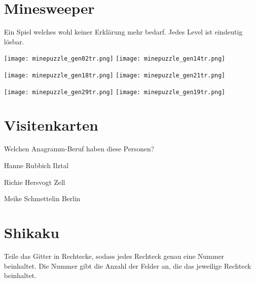 	\newpage
	\begin{multicols}{2}
	\section*{Minesweeper}
	Ein Spiel welches wohl keiner Erklärung mehr bedarf. Jedes Level ist eindeutig lösbar.

	\texttt{[image: minepuzzle\_gen02tr.png]}
	\texttt{[image: minepuzzle\_gen14tr.png]}

	\texttt{[image: minepuzzle\_gen18tr.png]}
	\texttt{[image: minepuzzle\_gen21tr.png]}

	\texttt{[image: minepuzzle\_gen29tr.png]}
	\texttt{[image: minepuzzle\_gen19tr.png]}

	\section*{Visitenkarten}
	Welchen Anagramm-Beruf haben diese Personen?

	\centerline{Hanne Rubbich \textendash{} Ilztal\\[0.2cm]}
	\centerline{Richie Hersvogt \textendash{} Zell\\[0.2cm]}
	\centerline{Meike Schmettelin \textendash{} Berlin\\[0.2cm]}

	\columnbreak
	\section*{Shikaku}

	Teile das Gitter in Rechtecke, sodass jedes Rechteck genau eine Nummer beinhaltet.
	Die Nummer gibt die Anzahl der Felder an, die das jeweilige Rechteck beinhaltet.


\end{multicols}
